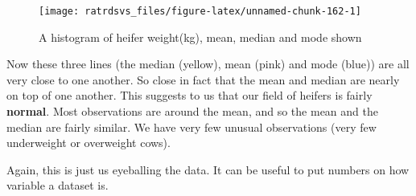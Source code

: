 \documentclass[
]{book}
\newenvironment{Shaded}{\begin{snugshade}}{\end{snugshade}}
\newcommand{\DataTypeTok}[1]{\textcolor[rgb]{0.13,0.29,0.53}{#1}}
\newcommand{\DecValTok}[1]{\textcolor[rgb]{0.00,0.00,0.81}{#1}}
\newcommand{\FloatTok}[1]{\textcolor[rgb]{0.00,0.00,0.81}{#1}}
\newcommand{\KeywordTok}[1]{\textcolor[rgb]{0.13,0.29,0.53}{\textbf{#1}}}
\newcommand{\NormalTok}[1]{#1}
\newcommand{\OperatorTok}[1]{\textcolor[rgb]{0.81,0.36,0.00}{\textbf{#1}}}
\newcommand{\StringTok}[1]{\textcolor[rgb]{0.31,0.60,0.02}{#1}}
\begin{document}
\begin{Shaded}
\end{Shaded}

\begin{figure}

{\centering \texttt{[image: ratrdsvs\_files/figure-latex/unnamed-chunk-162-1]} 

}

\caption{A histogram of heifer weight(kg), mean, median and mode shown}\label{fig:unnamed-chunk-162}
\end{figure}

Now these three lines (the median (yellow), mean (pink) and mode (blue)) are all very close to one another. So close in fact that the mean and median are nearly on top of one another. This suggests to us that our field of heifers is fairly \textbf{normal}. Most observations are around the mean, and so the mean and the median are fairly similar. We have very few unusual observations (very few underweight or overweight cows).

Again, this is just us eyeballing the data. It can be useful to put numbers on how variable a dataset is.
\end{document}
